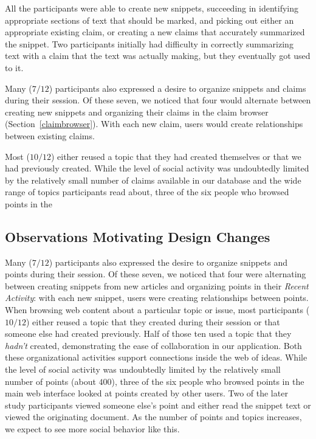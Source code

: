 \documentclass{chi2009}
\begin{document}
All the participants were able to create new snippets, succeeding in identifying appropriate sections of text that should be marked, and picking out either an appropriate existing claim, or creating a new claims that accurately summarized the snippet. Two participants initially had difficulty in correctly summarizing text with a claim that the text was actually making, but they eventually got used to it.

Many ($7/12$) participants also expressed a desire to organize snippets and claims during their session. Of these seven, we noticed that four would alternate between creating new snippets and organizing their claims in the claim browser (Section~\ref{claimbrowser}). With each new claim, users would create relationships between existing claims.

Most ($10/12$) either reused a topic that they had created themselves or that we had previously created. While the level of social activity was undoubtedly limited by the relatively small number of claims available in our database and the wide range of topics participants read about, three of the six people who browsed points in the 

\subsection{Observations Motivating Design Changes}


Many ($7/12$) participants also expressed the desire to organize snippets and points during their session. Of these seven, we noticed that four were alternating between creating snippets from new articles and organizing points in their {\it Recent Activity}: with each new snippet, users were creating relationships between points. When browsing web content about a particular topic or issue, most participants ($10/12$) either reused a topic that they created during their session or that someone else had created previously. Half of those ten used a topic that they {\it hadn't} created, demonstrating the ease of collaboration in our application. Both these organizational activities support connections inside the web of ideas. While the level of social activity was undoubtedly limited by the relatively small number of points (about $400$), three of the six people who browsed points in the main web interface looked at points created by other users. Two of the later study participants viewed someone else's point and either read the snippet text or viewed the originating document. As the number of points and topics increases, we expect to see more social behavior like this.
\end{document}
